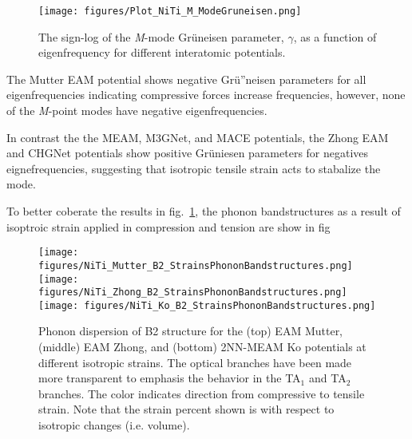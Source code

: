 \documentclass[preprint,colorlinks=true,linkcolor=black,citecolor=black]{elsarticle}
\begin{document}
\begin{figure}[!htp]
   \centering
  \texttt{[image: figures/Plot\_NiTi\_M\_ModeGruneisen.png]}
  \label{fig:modegruneisen}
  \caption{The sign-log of the \textit{M}-mode Gr\"{u}neisen
    parameter, $\gamma$, as a function of eigenfrequency for different
    interatomic potentials.}
\end{figure}

The Mutter EAM potential shows negative Gr\"{u}''neisen parameters for
all eigenfrequencies indicating compressive forces increase
frequencies, however, none of the \textit{M}-point modes have negative
eigenfrequencies. \par

In contrast the the MEAM, M3GNet, and MACE potentials, the Zhong EAM
and CHGNet potentials show positive Gr\"{u}niesen parameters for
negatives eignefrequencies, suggesting that isotropic tensile strain
acts to stabalize the mode. \par

To better coberate the results in fig.~\ref{fig:modegruneisen}, the
phonon bandstructures as a result of isoptroic strain applied in
compression and tension are show in fig


\begin{figure}[!htp]
  \begin{centering}
    \texttt{[image: figures/NiTi\_Mutter\_B2\_StrainsPhononBandstructures.png]}
    \vspace{1mm}
    \texttt{[image: figures/NiTi\_Zhong\_B2\_StrainsPhononBandstructures.png]}
    \vspace{1mm}
    \texttt{[image: figures/NiTi\_Ko\_B2\_StrainsPhononBandstructures.png]}
    \caption{ Phonon dispersion of B2 structure for the (top) EAM
      Mutter, (middle) EAM Zhong, and (bottom) 2NN-MEAM Ko potentials
      at different isotropic strains. The optical branches have been
      made more transparent to emphasis the behavior in the TA$_1$ and
      TA$_2$ branches. The color indicates direction from compressive
      to tensile strain. Note that the strain percent shown is with
      respect to isotropic changes (i.e. volume).  }
    \label{fig:mutter_zhong_ko_phonon_b2}
  \end{centering}
\end{figure}


\end{document}
